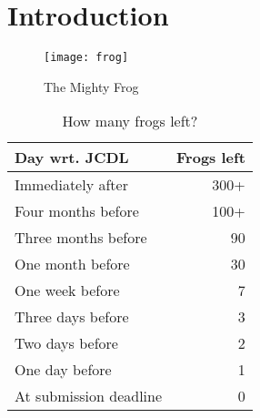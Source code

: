 \chapter{Introduction}
\label{ch:introduction}


\begin{figure}
  \centering
  \texttt{[image: frog]}
  \caption{The Mighty Frog}
  \label{fig:frog}
\end{figure}

\begin{table}
  \centering
  \caption{How many frogs left?}
  \label{tab:frogsleft}
  \begin{tabular}{ l | r }
    \hline
    \textbf{Day wrt. JCDL} & \textbf{Frogs left} \\
    \hline
    Immediately after      & 300+ \\
    Four months before     & 100+ \\
    Three months before    & 90 \\
    One month before       & 30 \\
    One week before        & 7 \\
    Three days before      & 3 \\
    Two days before        & 2 \\
    One day before         & 1 \\
    At submission deadline & 0 \\
    \hline
  \end{tabular}
\end{table}
